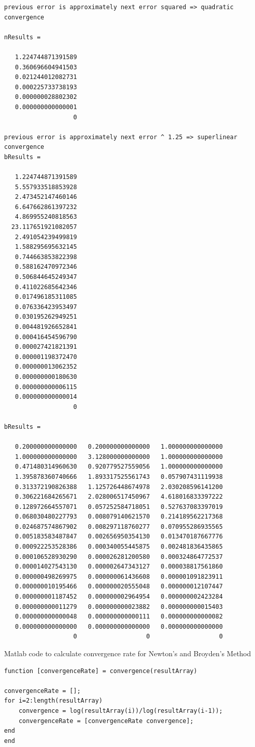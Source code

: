 \documentclass[11pt]{amsart}
\begin{document}
\begin{lstlisting}
previous error is approximately next error squared => quadratic convergence

nResults =

   1.224744871391589
   0.360696604941503
   0.021244012082731
   0.000225733738193
   0.000000028802302
   0.000000000000001
                   0

previous error is approximately next error ^ 1.25 => superlinear convergence
bResults =

   1.224744871391589
   5.557933518853928
   2.473452147460146
   6.647662861397232
   4.869955240818563
  23.117651921082057
   2.491054239499819
   1.588295695632145
   0.744663853822398
   0.588162470972346
   0.506844645249347
   0.411022685642346
   0.017496185311085
   0.076336423953497
   0.030195262949251
   0.004481926652841
   0.000416454596790
   0.000027421821391
   0.000001198372470
   0.000000013062352
   0.000000000180630
   0.000000000006115
   0.000000000000014
                   0

bResults =

   0.200000000000000   0.200000000000000   1.000000000000000
   1.000000000000000   3.128000000000000   1.000000000000000
   0.471480314960630   0.920779527559056   1.000000000000000
   1.395878360740666   1.893317525561743   0.057907431119938
   0.313372190826388   1.125726448674978   2.030208596141200
   0.306221684265671   2.028006517450967   4.618016833397222
   0.128972664557071   0.057252584718051   0.527637083397019
   0.068030480227793   0.008079140621570   0.214189562217368
   0.024687574867902   0.008297118760277   0.070955286935565
   0.005183583487847   0.002656950354130   0.013470187667776
   0.000922253528386   0.000340055445875   0.002481836435865
   0.000106528930290   0.000026281200580   0.000324864772537
   0.000014027543130   0.000002647343127   0.000038817561860
   0.000000498269975   0.000000061436608   0.000001091823911
   0.000000010195466   0.000000020555048   0.000000012107447
   0.000000001187452   0.000000002964954   0.000000002423284
   0.000000000011279   0.000000000023882   0.000000000015403
   0.000000000000048   0.000000000000111   0.000000000000082
   0.000000000000000   0.000000000000000   0.000000000000000
                   0                   0                   0
\end{lstlisting}
\clearpage
Matlab code to calculate convergence rate for Newton's and Broyden's Method
\begin{lstlisting}
function [convergenceRate] = convergence(resultArray)

convergenceRate = [];
for i=2:length(resultArray)
    convergence = log(resultArray(i))/log(resultArray(i-1));
    convergenceRate = [convergenceRate convergence];
end
end
\end{lstlisting}
\end{document}
